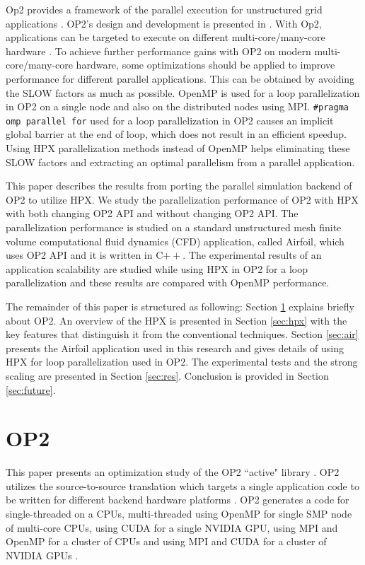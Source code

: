 \documentclass[conference]{IEEEtran}
\begin{document}
Op2 provides a framework of the parallel execution for unstructured grid applications \cite{o1}. OP2's design and development is presented in \cite{o2,o12}. With Op2, applications can be targeted to execute on different multi-core/many-core hardware \cite{o2,o3}. To achieve further performance gains with OP2 on modern multi-core/many-core hardware, some optimizations should be applied to improve performance for different parallel applications. This can be obtained by avoiding the SLOW factors as much as possible. OpenMP is used for a loop parallelization in OP2 on a single node and also on the distributed nodes using MPI. \texttt{\#pragma omp parallel for} used for a loop parallelization in OP2 causes an implicit global barrier at the end of loop, which does not result in an efficient speedup. Using HPX parallelization methods instead of OpenMP helps eliminating these SLOW factors and extracting an optimal parallelism from a parallel application.

This paper describes the results from porting the parallel simulation backend of OP2 to utilize HPX. We study the parallelization performance of OP2 with HPX with both changing OP2 API and without changing OP2 API. The parallelization performance is studied on a standard unstructured mesh finite volume computational fluid dynamics (CFD) application, called Airfoil, which uses OP2 API and it is written in C$++$. The experimental results of an application scalability are studied while using HPX in OP2 for a loop parallelization and these results are compared with OpenMP performance.

The remainder of this paper is structured as following: Section \ref{sec:op2} explains briefly about OP2. An overview of the HPX is presented in Section \ref{sec:hpx} with the key features that distinguish it from the conventional techniques. Section \ref{sec:air} presents the Airfoil application used in this research and gives details of using HPX for loop parallelization used in OP2. The experimental tests and the strong scaling are presented in Section \ref{sec:res}. Conclusion is provided in Section \ref{sec:future}.

\section{OP2}
\label{sec:op2}

This paper presents an optimization study of the OP2 ``active" library \cite{o1}. OP2 utilizes the source-to-source translation which targets a single application code to be written for different backend hardware platforms \cite{o2,o3,o4}. OP2 generates a code for single-threaded on a CPUs, multi-threaded using OpenMP for single SMP node of multi-core CPUs, using CUDA for a single NVIDIA GPU, using MPI and OpenMP for a cluster of CPUs and using MPI and CUDA for a cluster of NVIDIA GPUs \cite{o4}. 
\end{document}
